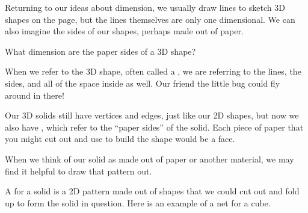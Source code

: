 \documentclass{ximera}
\begin{document}
Returning to our ideas about dimension, we usually draw lines to sketch 3D shapes on the page, but the lines themselves are only one dimensional. We can also imagine the sides of our shapes, perhaps made out of paper.
\begin{question}
What dimension are the paper sides of a 3D shape?
\begin{multipleChoice} 
\end{multipleChoice}
\end{question}
 When we refer to the 3D shape, often called a , we are referring to the lines, the sides, and all of the space inside as well. Our friend the little bug could fly around in there!

Our 3D solids still have vertices and edges, just like our 2D shapes, but now we also have , which refer to the ``paper sides'' of the solid. Each piece of paper that you might cut out and use to build the shape would be a face.

When we think of our solid as made out of paper or another material, we may find it helpful to draw that pattern out.
\begin{definition}
A  for a solid is a 2D pattern made out of shapes that we could cut out and fold up to form the solid in question. Here is an example of a net for a cube.
\begin{image}
\end{image}
\end{definition}
\end{document}
